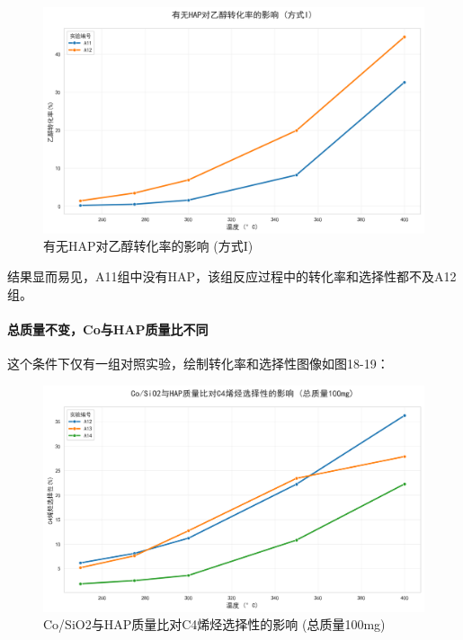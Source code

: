 \begin{figure}[h]%
	\centering%
	\includegraphics [scale=0.6]{图/2-4-1-2.png}
	\caption{有无HAP对乙醇转化率的影响 (方式I)} 
	\label{fig:1}
\end{figure}

结果显而易见，A11组中没有HAP，该组反应过程中的转化率和选择性都不及A12组。




\paragraph{总质量不变，Co与HAP质量比不同}
这个条件下仅有一组对照实验，绘制转化率和选择性图像如图18-19：

\begin{figure}[h]%
	\centering%
	\includegraphics [scale=0.6]{图/2-5-1-1.png}
	\caption{Co/SiO2与HAP质量比对C4烯烃选择性的影响 (总质量100mg)} 
	\label{fig:1}
\end{figure}

